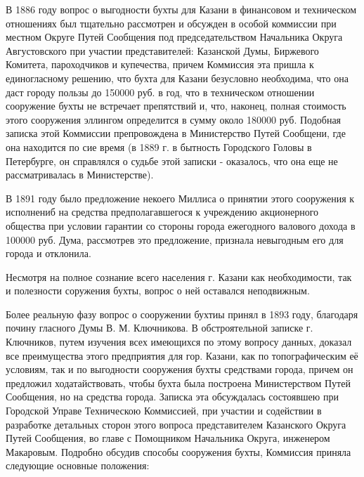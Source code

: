 \documentclass[oneside,final,14pt]{extreport}
\begin{document}
В 1886 году вопрос о выгодности бухты для Казани в финансовом и техническом отношениях был тщательно рассмотрен и обсужден в особой коммиссии при местном Округе Путей Сообщения под председательством Начальника Округа Августовского при участии представителей: Казанской Думы, Биржевого Комитета, пароходчиков и купечества, причем Коммиссия эта пришла к единогласному решению, что бухта для Казани безусловно необходима, что она даст городу пользы до 150000 руб. в год, что в техническом отношении сооружение бухты не встречает препятствий и, что, наконец,  полная стоимость этого сооружения эллингом определится в сумму около 180000 руб. Подобная записка этой Коммиссии препровождена в Министерство Путей Сообщени, где она находится по сие время (в 1889 г. в бытность Городского Головы в Петербурге, он справлялся о судьбе этой записки - оказалось, что она еще не рассматривалась в Министерстве). 

В 1891 году было предложение некоего Миллиса о принятии этого сооружения к исполнениб на средства предполагавшегося к учреждению акционерного общества при условии гарантии со стороны города ежегодного валового дохода в 100000 руб. Дума, рассмотрев это предложение, признала невыгодным его для города и отклонила.

Несмотря на полное сознание всего населения г. Казани как необходимости, так и полезности соружения бухты, вопрос о ней оставался неподвижным.

Более реальную фазу вопрос о сооружении бухтиы принял в 1893 году, благодаря почину гласного Думы В. М. Ключникова. В обстроятельной записке г. Ключников, путем изучения всех имеющихся по этому вопросу данных, доказал все преимущества этого предприятия для гор. Казани, как по топографическим её условиям, так и по выгодности сооружения бухты средствами города, причем он предложил ходатайствовать, чтобы бухта была построена Министерством Путей Сообщения, но на средства города. Записка эта обсуждалась состоявшею при Городской Управе Техническою Коммиссией, при участии и содействии в разработке детальных сторон этого вопроса представителем Казанского Округа Путей Сообщения, во главе с Помощником Начальника Округа, инженером Макаровым. Подробно обсудив способы сооружения бухты, Коммиссия приняла следующие основные положения: 
\end{document}
